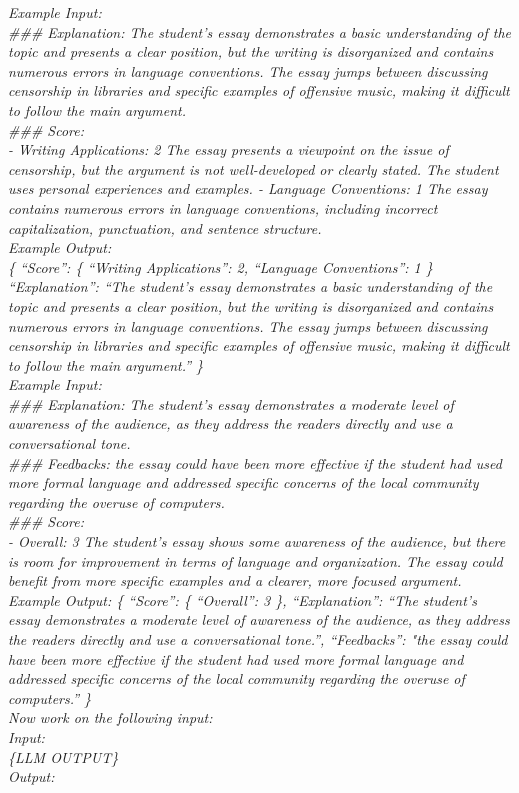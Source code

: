 \textit{
Example Input:\\
\#\#\# Explanation: The student's essay demonstrates a basic understanding of the topic and presents a clear position, but the writing is disorganized and contains numerous errors in language conventions. The essay jumps between discussing censorship in libraries and specific examples of offensive music, making it difficult to follow the main argument. \\
\#\#\# Score: \\
- Writing Applications: 2 The essay presents a viewpoint on the issue of censorship, but the argument is not well-developed or clearly stated. The student uses personal experiences and examples. 
- Language Conventions: 1 The essay contains numerous errors in language conventions, including incorrect capitalization, punctuation, and sentence structure. \\
Example Output:\\
\{
    ``Score'': \{
        ``Writing Applications'': 2,
        ``Language Conventions'': 1
    \}
    ``Explanation'': ``The student's essay demonstrates a basic understanding of the topic and presents a clear position, but the writing is disorganized and contains numerous errors in language conventions. The essay jumps between discussing censorship in libraries and specific examples of offensive music, making it difficult to follow the main argument.''
\} 
}\\

\textit{
Example Input:\\
\#\#\# Explanation: The student's essay demonstrates a moderate level of awareness of the audience, as they address the readers directly and use a conversational tone. \\
\#\#\# Feedbacks: the essay could have been more effective if the student had used more formal language and addressed specific concerns of the local community regarding the overuse of computers. \\
\#\#\# Score: \\
- Overall: 3 The student's essay shows some awareness of the audience, but there is room for improvement in terms of language and organization. The essay could benefit from more specific examples and a clearer, more focused argument. \\
Example Output:
\{
    ``Score'': \{
        ``Overall'': 3
    \},
    ``Explanation'': ``The student's essay demonstrates a moderate level of awareness of the audience, as they address the readers directly and use a conversational tone.'',
    ``Feedbacks'': "the essay could have been more effective if the student had used more formal language and addressed specific concerns of the local community regarding the overuse of computers.''
\} 
}\\
\textit{
Now work on the following input:\\
Input:\\
\{LLM OUTPUT\} \\
Output:
}